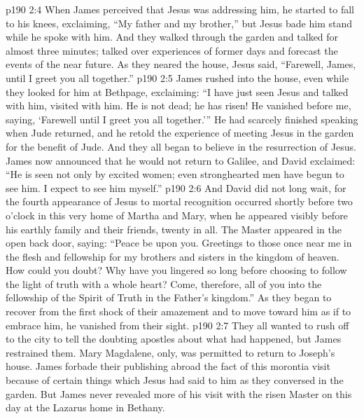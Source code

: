 \vs p190 2:4 When James perceived that Jesus was addressing him, he started to fall to his knees, exclaiming, “My father and my brother,” but Jesus bade him stand while he spoke with him. And they walked through the garden and talked for almost three minutes; talked over experiences of former days and forecast the events of the near future. As they neared the house, Jesus said, \textcolor{ubdarkred}{“Farewell, James, until I greet you all together.”}
\vs p190 2:5 James rushed into the house, even while they looked for him at Bethpage, exclaiming: “I have just seen Jesus and talked with him, visited with him. He is not dead; he has risen! He vanished before me, saying, ‘Farewell until I greet you all together.’” He had scarcely finished speaking when Jude returned, and he retold the experience of meeting Jesus in the garden for the benefit of Jude. And they all began to believe in the resurrection of Jesus. James now announced that he would not return to Galilee, and David exclaimed: “He is seen not only by excited women; even stronghearted men have begun to see him. I expect to see him myself.”
\pc \vs p190 2:6 And David did not long wait, for the fourth appearance of Jesus to mortal recognition occurred shortly before two o’clock in this very home of Martha and Mary, when he appeared visibly before his earthly family and their friends, twenty in all. The Master appeared in the open back door, saying: \textcolor{ubdarkred}{“Peace be upon you. Greetings to those once near me in the flesh and fellowship for my brothers and sisters in the kingdom of heaven. How could you doubt? Why have you lingered so long before choosing to follow the light of truth with a whole heart? Come, therefore, all of you into the fellowship of the Spirit of Truth in the Father’s kingdom.”} As they began to recover from the first shock of their amazement and to move toward him as if to embrace him, he vanished from their sight.\plusone
\pc \vs p190 2:7 They all wanted to rush off to the city to tell the doubting apostles about what had happened, but James restrained them. Mary Magdalene, only, was permitted to return to Joseph’s house. James forbade their publishing abroad the fact of this morontia visit because of certain things which Jesus had said to him as they conversed in the garden. But James never revealed more of his visit with the risen Master on this day at the Lazarus home in Bethany.
